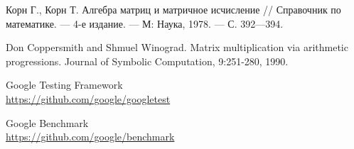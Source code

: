 


\begin{thebibliography}{8}

    Корн Г., Корн Т. Алгебра матриц и матричное исчисление // Справочник по математике. — 4-е издание. — М: Наука, 1978. — С. 392—394.

    Don Coppersmith and Shmuel Winograd. Matrix multiplication via arithmetic progressions. Journal of Symbolic Computation, 9:251-280, 1990.

    Google Testing Framework
    \\\url{https://github.com/google/googletest}

    Google Benchmark
    \\\url{https://github.com/google/benchmark}

\end{thebibliography}